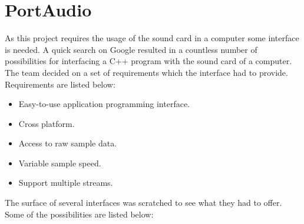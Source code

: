 \chapter{PortAudio}\label{chap:lib}\label{app:portaudio}
As this project requires the usage of the sound card in a computer some interface is needed. A quick search on Google resulted in a countless number of possibilities for interfacing a C++ program with the sound card of a computer. The team decided on a set of requirements which the interface had to provide. Requirements are listed below:

\begin{itemize}
\item Easy-to-use application programming interface.
\item Cross platform.
\item Access to raw sample data.
\item Variable sample speed.
\item Support multiple streams.
\end{itemize}

The surface of several interfaces was scratched to see what they had to offer. Some of the possibilities are listed below:

